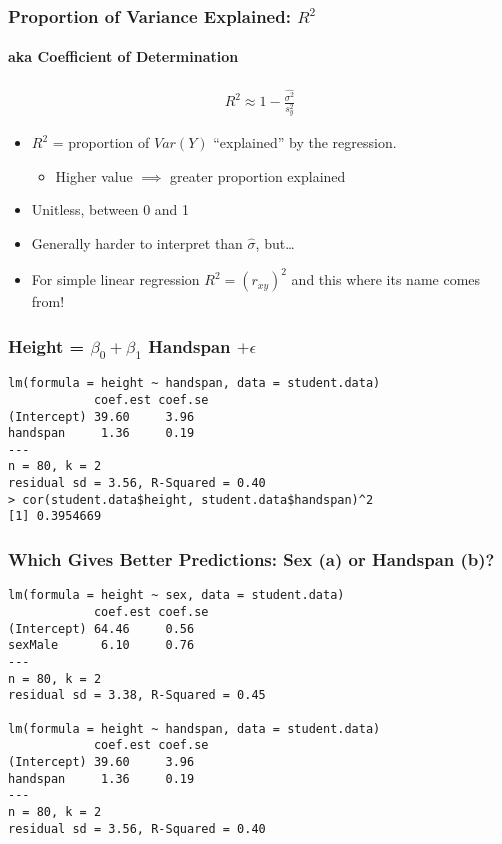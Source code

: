 \begin{frame}
\frametitle{Proportion of Variance Explained: $R^2$}
\framesubtitle{aka Coefficient of Determination}
	\begin{eqnarray*}
		R^2 \approx 1 - \frac{\widehat{\sigma^2}}{s_y^2}
	\end{eqnarray*}
		\begin{itemize}
			\item $R^2$ = proportion of $Var(Y)$ 
        ``explained'' by the regression.
			\begin{itemize}
			\item Higher value $\implies$ greater proportion explained 
			\end{itemize}
			\item Unitless, between 0 and 1 
      \item Generally harder to interpret than $\widehat{\sigma}$, but\dots 
			\item \alert{For simple linear regression $R^2 = (r_{xy})^2$ and this where its name comes from!}
		\end{itemize}
\end{frame}



\begin{frame}[fragile]
\frametitle{Height = $\beta_0 + \beta_1$ Handspan $+ \epsilon$}
\footnotesize
\begin{verbatim}
lm(formula = height ~ handspan, data = student.data)
            coef.est coef.se
(Intercept) 39.60     3.96  
handspan     1.36     0.19  
---
n = 80, k = 2
residual sd = 3.56, R-Squared = 0.40
> cor(student.data$height, student.data$handspan)^2
[1] 0.3954669
\end{verbatim}
\end{frame}


\begin{frame}[fragile]
\frametitle{Which Gives Better Predictions: Sex (a) or Handspan (b)?}
\footnotesize
\begin{verbatim}
lm(formula = height ~ sex, data = student.data)
            coef.est coef.se
(Intercept) 64.46     0.56  
sexMale      6.10     0.76  
---
n = 80, k = 2
residual sd = 3.38, R-Squared = 0.45

lm(formula = height ~ handspan, data = student.data)
            coef.est coef.se
(Intercept) 39.60     3.96  
handspan     1.36     0.19  
---
n = 80, k = 2
residual sd = 3.56, R-Squared = 0.40
\end{verbatim}

\end{frame}
